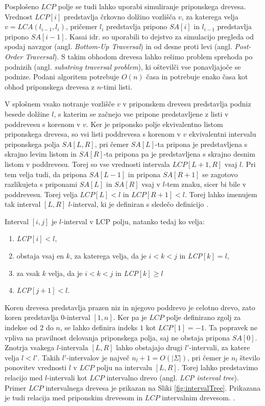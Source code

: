 Posplošeno $LCP$ polje se tudi lahko uporabi simuliranje priponskega drevesa. Vrednost $LCP[i]$ predstavlja črkovno dolžino vozlišča $v$, za katerega velja $v=LCA(l_{i-1},l_i)$, pričemer $l_i$ predstavlja pripono $SA[i]$ in $l_{i-1}$ predstavlja pripono $SA[i-1]$. Kasai idr. \cite{Kasai2001} so uporabili to dejstvo za simulacijo pregleda od spodaj navzgor (angl. \textit{Bottom-Up Traversal}) in od desne proti levi (angl. \textit{Post-Order Traversal}). S takim obhodom drevesa lahko rešimo problem sprehoda po podnizih (angl. \textit{substring traversal problem}), ki oštevilči vse ponavljajoče se podnize. Podani algoritem potrebuje $O(n)$ časa in potrebuje enako časa kot obhod priponskega drevesa z $n$-timi listi.

V splošnem vsako notranje vozlišče $v$ v priponskem drevesu predstavlja podniz besede dolžine $l$, s katerim se začnejo vse pripone predstavljene z listi v poddrevesu s korenom v $v$. Ker je priponsko polje ekvivalentno listom priponskega drevesa, so vsi listi poddrevesa s korenom v $v$ ekvivalentni intervalu priponskega polja $SA[L,R]$, pri čemer $SA[L]$-ta pripona je predstavljena s skrajno levim listom in $SA[R]$-ta pripona pa je predstavljena s skrajno desnim listom v poddrevesu. Torej so vse vrednosti intervala $LCP[L+1,R]$ vsaj $l$. Pri tem velja tudi, da pripona $SA[L-1]$ in pripona $SA[R+1]$ se zagotovo razlikujeta s priponami $SA[L]$ in $SA[R]$ vsaj v $l$-tem znaku, sicer bi bile v poddrevesu. Torej velja $LCP[L]< l$ in $LCP[R+1]< l$. Torej lahko imenujem tak interval $[L,R]$ $l$-interval, ki je definiran s sledečo definicijo \cite{Abouelhoda2004}.
\begin{defi}
    Interval $[i,j]$ je $l$-interval v LCP polju, natanko tedaj ko velja:
    \begin{enumerate}
        \item \textit{LCP}$[i]<l$,
        \item obstaja vsaj en $k$, za katerega velja, da je $i< k< j$ in \textit{LCP}$[k]=l$,
        \item za vsak $k$ velja, da je $i< k< j$ in \textit{LCP}$[k]\ge l$
        \item \textit{LCP}$[j+1]<l$.      
    \end{enumerate}
\end{defi}

Koren drevesa predstavlja prazen niz in njegovo poddrevo je celotno drevo, zato koren predstavlja $0$-interval $[1,n]$. Ker pa je $LCP$ polje definirano zgolj za indekse od $2$ do $n$, se lahko definira indeks $1$ kot $LCP[1]=-1$. Ta popravek ne vpliva na pravilnost delovanja priponskega polja, saj ne obstaja pripona $SA[0]$. Znotrja vsakega $l$-intervala $[L,R]$ lahko obstajajo drugi $l'$-intervali, za katere velja $l<l'$. Takih $l'$-intervalov je največ $n_l+1=O(|\Sigma|)$, pri čemer je $n_l$ število ponovitev vrednosti $l$ v $LCP$ polju na intervalu $[L,R]$. Torej lahko predstavimo relacijo med $l$-intervali kot $LCP$ intervalno drevo (angl. \textit{LCP interval tree}). Primer $LCP$ intervalnega drevesa je prikazan na Sliki \ref{fig:intervalTree}. Prikazana je tudi relacija med priponskim drevesom in $LCP$ intervalnim drevesom. \cite{Abouelhoda2004}.

